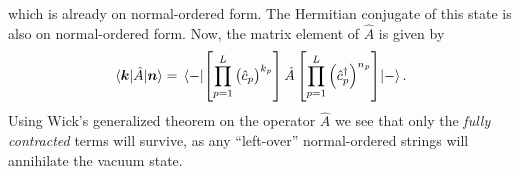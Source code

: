             which is already on normal-ordered form.
            The Hermitian conjugate of this state is also on normal-ordered
            form.
            Now, the matrix element of $\hat{A}$ is given by
            \begin{align}
                \mel*{\boldsymbol{k}}{\hat{A}}{\boldsymbol{n}}
                = \mel*{-}{
                    \left[ 
                        \prod_{p = 1}^{L}
                        \left( \hat{c}_{p} \right)^{k_p}
                     \right]
                    \hat{A}
                    \left[ 
                        \prod_{p = 1}^{L}\left( 
                            \hat{c}_{p}^{\dagger}
                         \right)^{n_p}
                     \right]
                }{-}.
            \end{align}
            Using Wick's generalized theorem on the operator $\hat{A}$ we see
            that only the \emph{fully contracted} terms will survive, as any
            ``left-over'' normal-ordered strings will annihilate the vacuum
            state.


